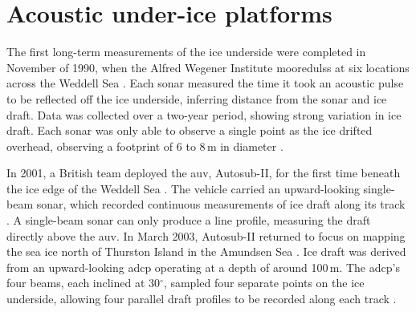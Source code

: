 
\section{Acoustic under-ice platforms}
\label{sec:ch2.acoustic_platforms}







The first long-term measurements of the ice underside were completed in November
of 1990, when the Alfred Wegener Institute moored\glspl{uls}
at six locations across the Weddell Sea \cite{behrendtSeaIceDraft2013}. 
Each sonar measured the time it took an acoustic pulse to be reflected off
the ice underside, inferring distance from the sonar and ice draft.
Data was collected over a two-year period, showing strong
variation in ice draft. Each sonar was only able to observe a single 
point as the ice drifted overhead, observing a footprint of 6 to 8\,m in 
diameter \cite{behrendtSeaIceDraft2013}.




In 2001, a British team deployed the \gls{auv},
Autosub-II, for the first time beneath the ice edge of the Weddell Sea \cite{brierleyAntarcticKrillSea2002}.
The vehicle  carried an upward-looking single-beam sonar, which recorded
continuous measurements of ice draft along its track
\cite{fanUnderwaterIceAdaptive2023}. A single-beam sonar can only produce a
line profile, measuring the draft directly above the \gls{auv}. In March 2003,
Autosub-II returned to focus on mapping the sea ice north of Thurston Island in
the Amundsen Sea \cite{banksMeasurementSeaiceDraft2006}. Ice draft was
derived from an upward-looking \gls{adcp}
operating at a depth of around 100\,m. The \gls{adcp}'s four beams, each inclined
at 30$^\circ$, sampled four separate points on the ice
underside, allowing four parallel draft profiles to be recorded along each
track \cite{banksMeasurementSeaiceDraft2006}.

